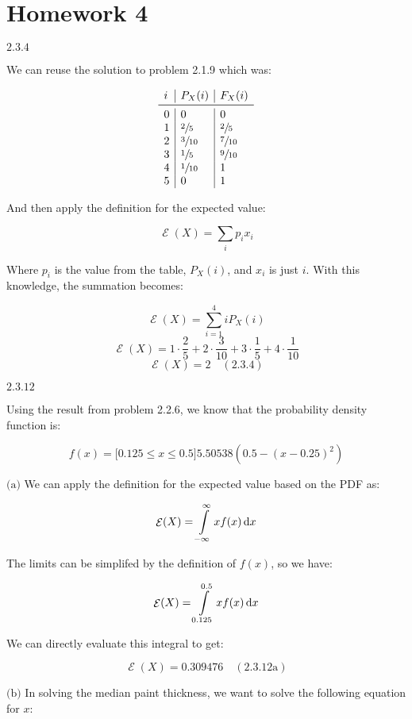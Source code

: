 \documentclass{article}
\newcommand{\problem}[2]{$\boxed{\text{#1.#2}}$}
\newcommand{\subproblem}[3]{$\boxed{\text{(#3)}}$}
\newcommand{\solution}[3]{\boxed{#3\quad(\text{#1.#2})}}
\newcommand{\subsolution}[4]{\boxed{#4\quad(\text{#1.#2#3})}}
\renewcommand{\d}[1]{\,\textnormal{d}#1}
\DeclareMathOperator{\E}{\mathcal{E}}
\begin{document}
\section*{Homework 4}

%
\problem{2.3}{4}

We can reuse the solution to problem 2.1.9 which was:

\[
\begin{array}{l|l|l}
i & P_X(i) & F_X(i) \\
\midrule
0 & 0 & 0 \\
1 & \sfrac{2}{5} & \sfrac{2}{5} \\
2 & \sfrac{3}{10} & \sfrac{7}{10} \\
3 & \sfrac{1}{5} & \sfrac{9}{10} \\
4 & \sfrac{1}{10} & 1 \\
5 & 0 & 1 \\
\end{array}
\]

And then apply the definition for the expected value:

\[
\E(X)=\sum\limits_i p_i x_i
\]

Where $p_i$ is the value from the table, $P_X(i)$, and $x_i$ is just
$i$. With this knowledge, the summation becomes:

\[
\E(X)=\sum\limits_{i=1}^4 iP_X(i)
\] \[
\E(X)=1\cdot\frac{2}{5}+2\cdot\frac{3}{10}+3\cdot\frac{1}{5}+4\cdot\frac{1}{10}
\] \[
\solution{2.3}{4}{\E(X)=2}
\]

%
\problem{2.3}{12}

Using the result from problem 2.2.6, we know that the probability
density function is:

\[
f(x)=\lbrack0.125\le x\le0.5\rbrack 5.50538\left(0.5-(x-0.25)^2\right)
\]

%
\subproblem{2.3}{12}{a} We can apply the definition for the expected value
based on the PDF as:

\[
\E(X)=\int\limits_{-\infty}^\infty xf(x)\d{x}
\]

The limits can be simplifed by the definition of $f(x)$, so we have:

\[
\E(X)=\int\limits_{0.125}^{0.5} xf(x)\d{x}
\]

We can directly evaluate this integral to get:

\[
\subsolution{2.3}{12}{a}{\E(X)=0.309476}
\]

%
\subproblem{2.3}{12}{b} In solving the median paint thickness, we want
to solve the following equation for $x$:
\end{document}
